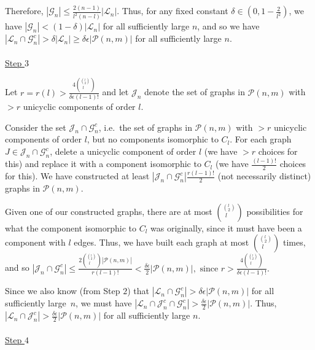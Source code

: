 \documentclass{article}
\newtheorem{Proof of Theorem}{Proof of Theorem}
\begin{document}
Therefore, $|\mathcal{G}_{n}| \leq \frac{2(n-1)}{l^{2}(n-l)} |\mathcal{L}_{n}|$.
Thus, for any fixed constant $\delta \in \left( 0, 1-\frac{2}{l^{2}} \right)$,
we have $|\mathcal{G}_{n}| < (1- \delta) |\mathcal{L}_{n}|$ for all sufficiently large $n$,
and so we have
$|\mathcal{L}_{n} \cap \mathcal{G}_{n}^{c}| > \delta |\mathcal{L}_{n}| \geq \delta \epsilon |\mathcal{P}(n,m)|$
for all sufficiently large $n$. \\
\\
\underline{Step $3$} 

Let $r = r(l) > \frac{4 \left( ^{ \left( ^{l}_{2} \right)} _{\phantom{q}l} \right)}{\delta \epsilon (l-1)!}$
and let $\mathcal{J}_{n}$ denote the set of graphs in $\mathcal{P}(n,m)$ with $>r$ unicyclic components of order $l$.

Consider the set $\mathcal{J}_{n} \cap \mathcal{G}_{n}^{c}$,
i.e.~the set of graphs in $\mathcal{P}(n,m)$ with $>r$ unicyclic components of order $l$,
but no components isomorphic to $C_{l}$.
For each graph $J \in \mathcal{J}_{n} \cap \mathcal{G}_{n}^{c}$,
delete a unicyclic component of order $l$ (we have $>r$ choices for this)
and replace it with a component isomorphic to $C_{l}$ (we have $\frac{(l-1)!}{2}$ choices for this).
We have constructed at least $|\mathcal{J}_{n} \cap \mathcal{G}_{n}^{c}| \frac{r(l-1)!}{2}$
(not necessarily distinct) graphs in $\mathcal{P}(n,m)$.

Given one of our constructed graphs, there are at most 
$\left( ^{ \left( ^{l}_{2} \right)} _{\phantom{q}l} \right)$ 
possibilities for what the component isomorphic to $C_{l}$ was originally,
since it must have been a component with $l$ edges.
Thus, we have built each graph at most $\left( ^{ \left( ^{l}_{2} \right)} _{\phantom{q}l} \right)$ times,
and so 
$
|\mathcal{J}_{n} \cap \mathcal{G}_{n}^{c}| \leq 
\frac{ 2 \left( ^{ \left( ^{l}_{2} \right)} _{\phantom{q}l} \right) |\mathcal{P}(n,m)| } {r(l-1)!} 
< \frac{\delta \epsilon}{2} |\mathcal{P}(n,m)|, \textrm{ since }
r > \frac{4 \left( ^{ \left( ^{l}_{2} \right)} _{\phantom{q}l} \right)}{\delta \epsilon (l-1)!}.
$

Since we also know (from Step $2$) that 
$|\mathcal{L}_{n} \cap \mathcal{G}_{n}^{c}| > \delta \epsilon |\mathcal{P}(n,m)|$ for all sufficiently large~$n$,
we must have 
$|\mathcal{L}_{n} \cap \mathcal{J}_{n}^{c} \cap \mathcal{G}_{n}^{c}| > \frac{\delta \epsilon}{2} |\mathcal{P}(n,m)|$.
Thus, 
$|\mathcal{L}_{n} \cap\mathcal{J}_{n}^{c}| > \frac{\delta \epsilon}{2} |\mathcal{P}(n,m)|$ 
for all sufficiently large $n$. \\
\\
\underline{Step $4$} 
\end{document}
